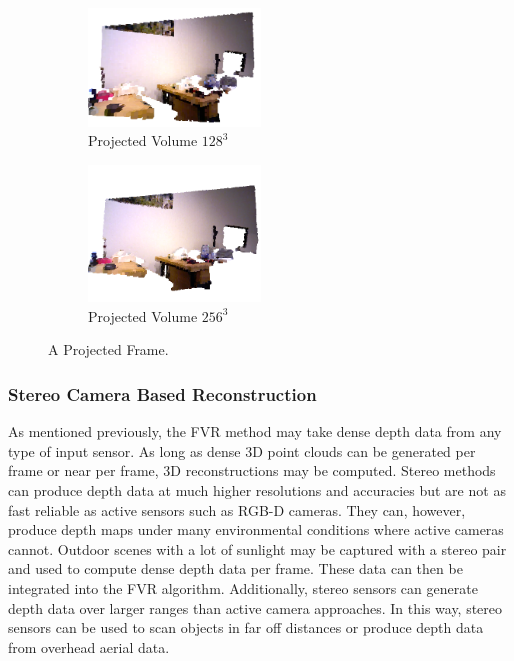 \begin{figure}[!htb]
         \begin{subfigure}[b]{1.8in}
                \includegraphics[width=1.8in]{images/ch2/volumeF11128}
                \caption{Projected Volume $128^3$}
                \label{fig:VOLUMEEXAMPLE128}
        \end{subfigure}%
         \begin{subfigure}[b]{1.8in}
                \includegraphics[width=1.8in]{images/ch2/volumeF11256}
                \caption{Projected Volume $256^3$}
                \label{fig:VOLUMEEXAMPLE384}
        \end{subfigure}%
       \caption{A Projected Frame.}
       \label{fig:PROJECTED_FRAME}
\end{figure}

\subsubsection{Stereo Camera Based Reconstruction}
\label{subsec:SCBR}
As mentioned previously, the FVR method may take dense depth data from any type of input sensor. As long as dense 3D point clouds can be generated per frame or near per frame, 3D reconstructions may be computed. Stereo methods can produce depth data at much higher resolutions and accuracies but are not as fast reliable as active sensors such as RGB-D cameras. They can, however, produce depth maps under many environmental conditions where active cameras cannot. Outdoor scenes with a lot of sunlight may be captured with a stereo pair and used to compute dense depth data per frame. These data can then be integrated into the FVR algorithm. Additionally, stereo sensors can generate depth data over larger ranges than active camera approaches. In this way, stereo sensors can be used to scan objects in far off distances or produce depth data from overhead aerial data. \\

